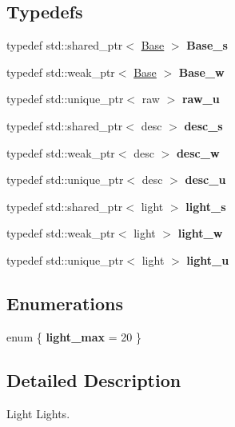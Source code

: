\subsection*{\-Typedefs}
\begin{DoxyCompactItemize}
\item 
\hypertarget{namespaceNeb_1_1Light_a03237411d9ad123ad266cab98dabccc8}{typedef std\-::shared\-\_\-ptr$<$ \hyperlink{classNeb_1_1Light_1_1Base}{\-Base} $>$ {\bfseries \-Base\-\_\-s}}\label{namespaceNeb_1_1Light_a03237411d9ad123ad266cab98dabccc8}

\item 
\hypertarget{namespaceNeb_1_1Light_a0b33c3884229660efb4220e54b2a0834}{typedef std\-::weak\-\_\-ptr$<$ \hyperlink{classNeb_1_1Light_1_1Base}{\-Base} $>$ {\bfseries \-Base\-\_\-w}}\label{namespaceNeb_1_1Light_a0b33c3884229660efb4220e54b2a0834}

\item 
\hypertarget{namespaceNeb_1_1Light_a96dd3a67387acb31580743df8adc7616}{typedef std\-::unique\-\_\-ptr$<$ raw $>$ {\bfseries raw\-\_\-u}}\label{namespaceNeb_1_1Light_a96dd3a67387acb31580743df8adc7616}

\item 
\hypertarget{namespaceNeb_1_1Light_aca0e04131e2d48988c444e52c1c4c3a2}{typedef std\-::shared\-\_\-ptr$<$ desc $>$ {\bfseries desc\-\_\-s}}\label{namespaceNeb_1_1Light_aca0e04131e2d48988c444e52c1c4c3a2}

\item 
\hypertarget{namespaceNeb_1_1Light_ac253732ab1684bc58c57e6548884fc9e}{typedef std\-::weak\-\_\-ptr$<$ desc $>$ {\bfseries desc\-\_\-w}}\label{namespaceNeb_1_1Light_ac253732ab1684bc58c57e6548884fc9e}

\item 
\hypertarget{namespaceNeb_1_1Light_a6fd49b947c4cb831fbe664e88c28b8ad}{typedef std\-::unique\-\_\-ptr$<$ desc $>$ {\bfseries desc\-\_\-u}}\label{namespaceNeb_1_1Light_a6fd49b947c4cb831fbe664e88c28b8ad}

\item 
\hypertarget{namespaceNeb_1_1Light_ae52a2ee906ae0041ea94f58031e107ff}{typedef std\-::shared\-\_\-ptr$<$ light $>$ {\bfseries light\-\_\-s}}\label{namespaceNeb_1_1Light_ae52a2ee906ae0041ea94f58031e107ff}

\item 
\hypertarget{namespaceNeb_1_1Light_a3d27d8bc596c7032b12b8de173179608}{typedef std\-::weak\-\_\-ptr$<$ light $>$ {\bfseries light\-\_\-w}}\label{namespaceNeb_1_1Light_a3d27d8bc596c7032b12b8de173179608}

\item 
\hypertarget{namespaceNeb_1_1Light_a48e27b38f1a109eca8bb99deba0548d3}{typedef std\-::unique\-\_\-ptr$<$ light $>$ {\bfseries light\-\_\-u}}\label{namespaceNeb_1_1Light_a48e27b38f1a109eca8bb99deba0548d3}

\end{DoxyCompactItemize}
\subsection*{\-Enumerations}
\begin{DoxyCompactItemize}
\item 
enum \{ {\bfseries light\-\_\-max} =  20
 \}
\end{DoxyCompactItemize}


\subsection{\-Detailed \-Description}
\-Light \-Lights. 